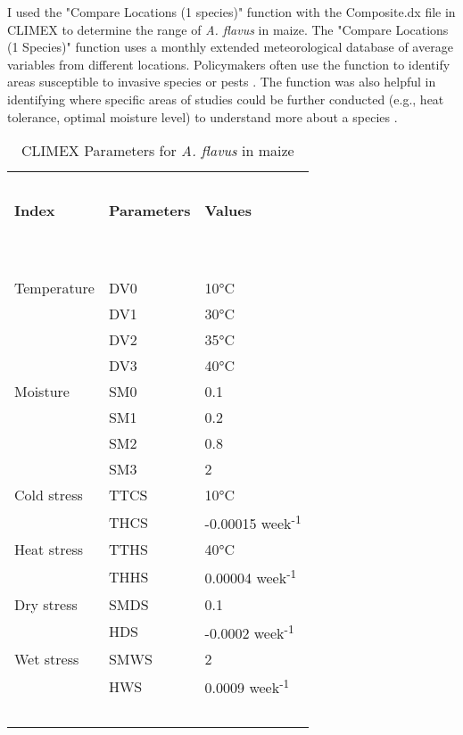 I used the "Compare Locations (1 species)" function with the Composite.dx file in CLIMEX to determine the range of \textit{A. flavus} in maize. The "Compare Locations (1 Species)" function uses a monthly extended meteorological database of average variables from different locations. Policymakers often use the function to identify areas susceptible to invasive species or pests \citep{kriticos2015climex}. The function was also helpful in identifying where specific areas of studies could be further conducted (e.g., heat tolerance, optimal moisture level) to understand more about a species \citep{kriticos2015climex}.
\vspace{\baselineskip} \\

\begin{table}[!ht]
    \caption{CLIMEX Parameters for \textit{A. flavus} in maize} %
    \centering
    \begin{tabular}{lll}
        \hline
        ~ & ~ & ~  \\
        \textbf{Index} & \textbf{Parameters} & \textbf{Values} \\ 
        ~ & ~ & ~  \\ \hline\hline
        ~ & ~ & ~  \\ 
        Temperature & DV0 & 10°C \\ 
        ~ & DV1 & 30°C \\ 
        ~ & DV2 & 35°C \\ 
        ~ & DV3 & 40°C \\ 
        Moisture & SM0 & 0.1 \\ 
        ~ & SM1 & 0.2 \\ 
        ~ & SM2 & 0.8 \\ 
        ~ & SM3 & 2 \\ 
        Cold stress & TTCS & 10°C \\ 
        ~ & THCS &  -0.00015 week\textsuperscript{-1} \\ 
        Heat stress & TTHS & 40°C \\ 
        ~ & THHS & 0.00004 week\textsuperscript{-1} \\ 
        Dry stress & SMDS & 0.1 \\ 
        ~ & HDS &  -0.0002 week\textsuperscript{-1} \\ 
        Wet stress & SMWS & 2 \\ 
        ~ & HWS & 0.0009 week\textsuperscript{-1} \\ 
        ~ & ~ & ~  \\ \hline
    \end{tabular}
\end{table}

